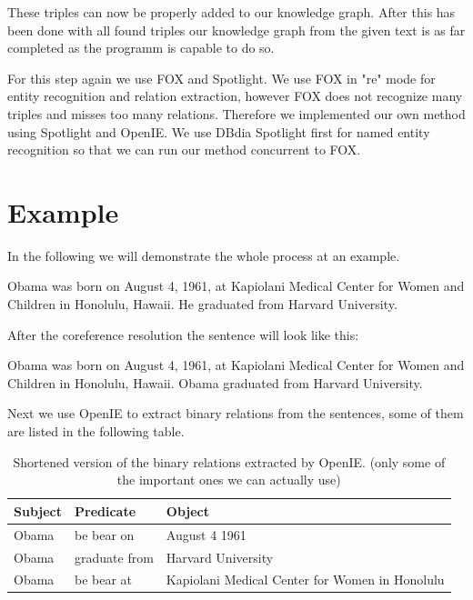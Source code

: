 \documentclass[runningheads]{llncs}
\begin{document}
These triples can now be properly added to our knowledge graph. After this has been done with all found triples our knowledge graph from the given text is as far completed as the programm is capable to do so.

For this step again we use FOX and Spotlight. We use FOX in "re" mode for entity recognition and relation extraction, however FOX does not recognize many triples and misses too many relations. Therefore we implemented our own method using Spotlight and OpenIE.
We use DBdia Spotlight first for named entity recognition so that we can run our method concurrent to FOX. 

\section{Example}
In the following we will demonstrate the whole process at an example.

\begin{example}
Obama was born on August 4, 1961, at Kapiolani Medical Center for
Women and Children in Honolulu, Hawaii. He graduated from Harvard
University.\end{example}

After the coreference resolution the sentence will look like this: 

\begin{example}
	Obama was born on August 4, 1961, at Kapiolani Medical Center for
	Women and Children in Honolulu, Hawaii. Obama graduated from Harvard
	University.\end{example}

Next we use OpenIE to extract binary relations from the sentences, some of them are listed in the following table.


\begin{table}
		\caption{Shortened version of the binary relations extracted by OpenIE. (only some of the important ones we can actually use)}\label{tab1}
	\begin{center}
		\begin{tabularx}{\textwidth}{@{}|l|l|Y|@{}}
			\hline
			\textbf{Subject} &  \textbf{Predicate} & \textbf{Object}\\
			\hline
			Obama &  be bear on & August 4 1961\\
			Obama &  graduate from & Harvard University\\
			Obama &  be bear at & Kapiolani Medical Center for Women in Honolulu\\
			\hline
		\end{tabularx}
	\end{center}
\end{table}
\end{document}
